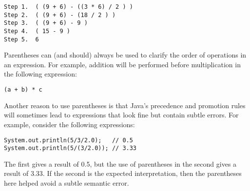 \begin{jjjlisting}
\begin{lstlisting}
Step 1.  ( (9 + 6) - ((3 * 6) / 2 ) )
Step 2.  ( (9 + 6) - (18 / 2 ) )
Step 3.  ( (9 + 6) - 9 )
Step 4.  ( 15 - 9 )
Step 5.  6
\end{lstlisting}
\end{jjjlisting}


\noindent Parentheses can (and should) always be used to clarify
the order of operations in an expression.  For example, addition will
be performed before multiplication in the following expression:

\begin{jjjlisting}
\begin{lstlisting}
(a + b) * c
\end{lstlisting}
\end{jjjlisting}

\noindent Another reason to use parentheses is that Java's precedence 
and promotion rules will
sometimes lead to expressions that look fine but contain subtle 
errors.  For example, consider the following expressions:

\begin{jjjlisting}
\begin{lstlisting}
System.out.println(5/3/2.0);   // 0.5
System.out.println(5/(3/2.0)); // 3.33
\end{lstlisting}
\end{jjjlisting}

\noindent The first gives a result of 0.5, but the use of parentheses
in the second gives a result of 3.33. If the second is the
expected interpretation, then the parentheses here helped
avoid a subtle semantic error.




